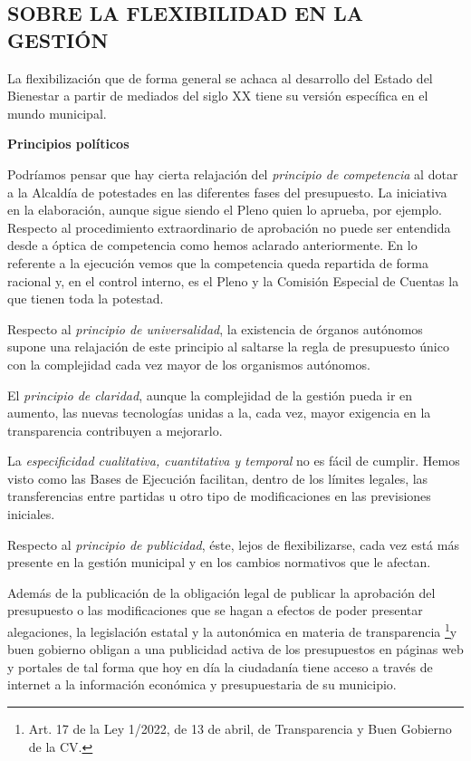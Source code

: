 \documentclass[
]{article}
\begin{document}
\hypertarget{sobre-la-flexibilidad-en-la-gestiuxf3n}{%
\subsection{SOBRE LA FLEXIBILIDAD EN LA
GESTIÓN}\label{sobre-la-flexibilidad-en-la-gestiuxf3n}}

La flexibilización que de forma general se achaca al desarrollo del
Estado del Bienestar a partir de mediados del siglo XX tiene su versión
específica en el mundo municipal.

\textbf{Principios políticos}

Podríamos pensar que hay cierta relajación del \emph{principio de
competencia} al dotar a la Alcaldía de potestades en las diferentes
fases del presupuesto. La iniciativa en la elaboración, aunque sigue
siendo el Pleno quien lo aprueba, por ejemplo. Respecto al procedimiento
extraordinario de aprobación no puede ser entendida desde a óptica de
competencia como hemos aclarado anteriormente. En lo referente a la
ejecución vemos que la competencia queda repartida de forma racional y,
en el control interno, es el Pleno y la Comisión Especial de Cuentas la
que tienen toda la potestad.

Respecto al \emph{principio de universalidad}, la existencia de órganos
autónomos supone una relajación de este principio al saltarse la regla
de presupuesto único con la complejidad cada vez mayor de los organismos
autónomos.

El \emph{principio de claridad}, aunque la complejidad de la gestión
pueda ir en aumento, las nuevas tecnologías unidas a la, cada vez, mayor
exigencia en la transparencia contribuyen a mejorarlo.

La \emph{especificidad cualitativa, cuantitativa y temporal} no es fácil
de cumplir. Hemos visto como las Bases de Ejecución facilitan, dentro de
los límites legales, las transferencias entre partidas u otro tipo de
modificaciones en las previsiones iniciales.

Respecto al \emph{principio de publicidad}, éste, lejos de
flexibilizarse, cada vez está más presente en la gestión municipal y en
los cambios normativos que le afectan.

Además de la publicación de la obligación legal de publicar la
aprobación del presupuesto o las modificaciones que se hagan a efectos
de poder presentar alegaciones, la legislación estatal y la autonómica
en materia de transparencia \footnote{Art. 17 de la Ley 1/2022, de 13 de
  abril, de Transparencia y Buen Gobierno de la CV.}y buen gobierno
obligan a una publicidad activa de los presupuestos en páginas web y
portales de tal forma que hoy en día la ciudadanía tiene acceso a través
de internet a la información económica y presupuestaria de su municipio.
\end{document}
